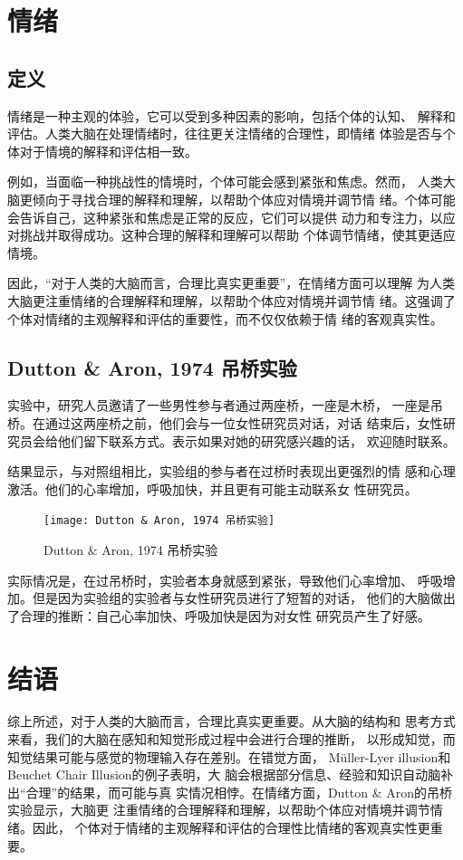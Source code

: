 \documentclass[12pt,a4paper]{ctexart}
\begin{document}
	\section{情绪}
	\subsection{定义}
	情绪是一种主观的体验，它可以受到多种因素的影响，包括个体的认知、
	解释和评估。人类大脑在处理情绪时，往往更关注情绪的合理性，即情绪
	体验是否与个体对于情境的解释和评估相一致。

	例如，当面临一种挑战性的情境时，个体可能会感到紧张和焦虑。然而，
	人类大脑更倾向于寻找合理的解释和理解，以帮助个体应对情境并调节情
	绪。个体可能会告诉自己，这种紧张和焦虑是正常的反应，它们可以提供
	动力和专注力，以应对挑战并取得成功。这种合理的解释和理解可以帮助
	个体调节情绪，使其更适应情境。

	因此，“对于人类的大脑而言，合理比真实更重要”，在情绪方面可以理解
	为人类大脑更注重情绪的合理解释和理解，以帮助个体应对情境并调节情
	绪。这强调了个体对情绪的主观解释和评估的重要性，而不仅仅依赖于情
	绪的客观真实性。

	\subsection{Dutton \texorpdfstring{\&}{} Aron, 1974 吊桥实验}
	实验中，研究人员邀请了一些男性参与者通过两座桥，一座是木桥，
	一座是吊桥。在通过这两座桥之前，他们会与一位女性研究员对话，对话
	结束后，女性研究员会给他们留下联系方式。表示如果对她的研究感兴趣的话，
	欢迎随时联系。

	结果显示，与对照组相比，实验组的参与者在过桥时表现出更强烈的情
	感和心理激活。他们的心率增加，呼吸加快，并且更有可能主动联系女
	性研究员。

	\begin{figure}[h]
		\centering
    	\texttt{[image: Dutton \& Aron, 1974 吊桥实验]}
    	\caption{Dutton \& Aron, 1974 吊桥实验}
	\end{figure}

	实际情况是，在过吊桥时，实验者本身就感到紧张，导致他们心率增加、
	呼吸增加。但是因为实验组的实验者与女性研究员进行了短暂的对话，
	他们的大脑做出了合理的推断：自己心率加快、呼吸加快是因为对女性
	研究员产生了好感。

	\section{结语}

	综上所述，对于人类的大脑而言，合理比真实更重要。从大脑的结构和
	思考方式来看，我们的大脑在感知和知觉形成过程中会进行合理的推断，
	以形成知觉，而知觉结果可能与感觉的物理输入存在差别。在错觉方面，
	Müller-Lyer illusion和Beuchet Chair Illusion的例子表明，大
	脑会根据部分信息、经验和知识自动脑补出“合理”的结果，而可能与真
	实情况相悖。在情绪方面，Dutton \& Aron的吊桥实验显示，大脑更
	注重情绪的合理解释和理解，以帮助个体应对情境并调节情绪。因此，
	个体对于情绪的主观解释和评估的合理性比情绪的客观真实性更重要。
	
\end{document}
